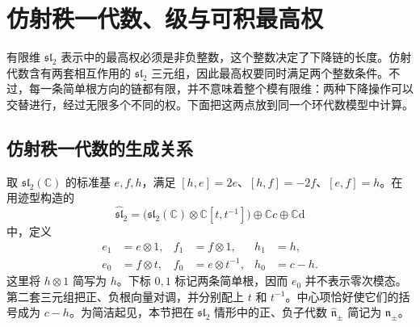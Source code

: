 
\section{仿射秩一代数、级与可积最高权}
\label{b5:sec:G03}

有限维 \(\mathfrak{sl}_2\) 表示中的最高权必须是非负整数，这个整数决定了下降链的长度。仿射代数含有两套相互作用的 \(\mathfrak{sl}_2\) 三元组，因此最高权要同时满足两个整数条件。不过，每一条简单根方向的链都有限，并不意味着整个模有限维：两种下降操作可以交替进行，经过无限多个不同的权。下面把这两点放到同一个环代数模型中计算。

\subsection{仿射秩一代数的生成关系}
\label{b5:subsec:G03:01}

取 \(\mathfrak{sl}_2(\mathbb C)\) 的标准基 \(e,f,h\)，满足 \([h,e]=2e\)、\([h,f]=-2f\)、\([e,f]=h\)。在用迹型构造的
\[
	\widehat{\mathfrak{sl}}_2
	=\bigl(\mathfrak{sl}_2(\mathbb C)\otimes\mathbb C[t,t^{-1}]\bigr)
	\oplus\mathbb Cc\oplus\mathbb C\mathrm d
\]
中，定义
\begin{equation}\label{b5:eq:G-affine-chevalley-elements}
	\begin{aligned}
		e_1&=e\otimes1,& f_1&=f\otimes1,& h_1&=h,\\
		e_0&=f\otimes t,& f_0&=e\otimes t^{-1},& h_0&=c-h.
	\end{aligned}
\end{equation}
这里将 \(h\otimes1\) 简写为 \(h\)。下标 \(0,1\) 标记两条简单根，因而 \(e_0\) 并不表示零次模态。第二套三元组把正、负根向量对调，并分别配上 \(t\) 和 \(t^{-1}\)。中心项恰好使它们的括号成为 \(c-h\)。为简洁起见，本节把在 \(\mathfrak{sl}_2\) 情形中的正、负子代数 \(\widehat{\mathfrak n}_\pm\) 简记为 \(\mathfrak n_\pm\)。

